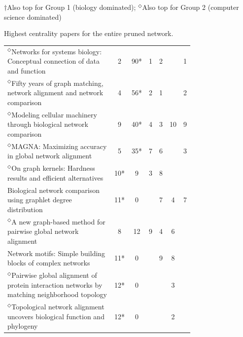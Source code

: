 \documentclass[12pt]{thesis}
\theoremstyle{plain}
\theoremstyle{definition}
\theoremstyle{remark}
\begin{document}
\begin{table}[H]
{\vspace{-.01cm}
$\dagger$Also top for Group 1 (biology dominated); $^\Diamond$Also top for Group 2 (computer science dominated)
}
\vspace{-.22cm}
\caption{Highest centrality papers for the entire pruned network.}
\label{tab:toppapers_all}
\end{table}

\begin{table}[H]
\centering
\vspace{-.5cm}
{\setlength\extrarowheight{2pt}\setlength{\tabcolsep}{3pt}\fontsize{10}{13}\selectfont
\begin{tabular}{|L{0.75\linewidth}|c|c|c|c|c|c|}
\hline
&  &   &  &   &   &  \\ 
\hline\hline
$^\Diamond$Networks for systems biology: Conceptual connection of data and function  \cite{Emmert_Streib_2011} & 2 & 90* & 1 & 2 &  & 1 \\ \hline
$^\Diamond$Fifty years of graph matching, network alignment and network comparison  \cite{Emmert_Streib_2016} & 4 & 56* & 2 & 1 &  & 2 \\ \hline
$^\Diamond$Modeling cellular machinery through biological network comparison  \cite{Sharan_2006} & 9 & 40* & 4 & 3 & 10 & 9 \\ \hline
$^\Diamond$MAGNA: Maximizing accuracy in global network alignment  \cite{Saraph_2014} & 5 & 35* & 7 & 6 &  & 3 \\ \hline
$^\Diamond$On graph kernels: Hardness results and efficient alternatives  \cite{Gartner_2003} & 10* & 9 & 3 & 8 &  &  \\ \hline
Biological network comparison using graphlet degree distribution  \cite{Przulj_2007} & 11* & 0 &  & 7 & 4 & 7 \\ \hline
$^\Diamond$A new graph-based method for pairwise global network alignment  \cite{Klau_2009} & 8 & 12 & 9 & 4 & 6 &  \\ \hline
Network motifs: Simple building blocks of complex networks  \cite{Milo_2002} & 11* & 0 &  & 9 & 8 &  \\ \hline
$^\Diamond$Pairwise global alignment of protein interaction networks by matching neighborhood topology  \cite{Singh_2007} & 12* & 0 &  &  & 3 &  \\ \hline
$^\Diamond$Topological network alignment uncovers biological function and phylogeny  \cite{Kuchaiev_2010} & 12* & 0 &  &  & 2 &  \\ \hline

\end{tabular}}
\end{table}
\end{document}

